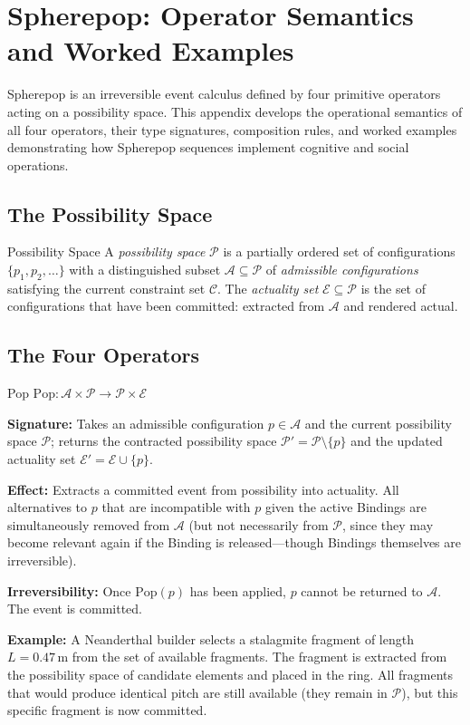 \chapter{Spherepop: Operator Semantics and Worked Examples}
\label{app:spherepop}

\noindent Spherepop is an irreversible event calculus defined by four primitive
operators acting on a possibility space. This appendix develops the operational
semantics of all four operators, their type signatures, composition rules, and
worked examples demonstrating how Spherepop sequences implement cognitive and
social operations.

\section{The Possibility Space}

\begin{definition}{Possibility Space}
A \emph{possibility space} $\mathcal{P}$ is a partially ordered set of
configurations $\{p_1, p_2, \ldots\}$ with a distinguished subset
$\mathcal{A} \subseteq \mathcal{P}$ of \emph{admissible configurations}
satisfying the current constraint set $\mathcal{C}$. The \emph{actuality set}
$\mathcal{E} \subseteq \mathcal{P}$ is the set of configurations that have
been committed: extracted from $\mathcal{A}$ and rendered actual.
\end{definition}

\section{The Four Operators}

\begin{definition}{Pop}
$\mathrm{Pop}: \mathcal{A} \times \mathcal{P} \to \mathcal{P} \times \mathcal{E}$

\textbf{Signature:} Takes an admissible configuration $p \in \mathcal{A}$ and
the current possibility space $\mathcal{P}$; returns the contracted possibility
space $\mathcal{P}' = \mathcal{P} \setminus \{p\}$ and the updated actuality set
$\mathcal{E}' = \mathcal{E} \cup \{p\}$.

\textbf{Effect:} Extracts a committed event from possibility into actuality. All
alternatives to $p$ that are incompatible with $p$ given the active Bindings are
simultaneously removed from $\mathcal{A}$ (but not necessarily from $\mathcal{P}$,
since they may become relevant again if the Binding is released---though Bindings
themselves are irreversible).

\textbf{Irreversibility:} Once $\mathrm{Pop}(p)$ has been applied, $p$ cannot
be returned to $\mathcal{A}$. The event is committed.

\textbf{Example:} A Neanderthal builder selects a stalagmite fragment of length
$L = 0.47\,\text{m}$ from the set of available fragments. The fragment is
extracted from the possibility space of candidate elements and placed in the ring.
All fragments that would produce identical pitch are still available (they remain
in $\mathcal{P}$), but this specific fragment is now committed.
\end{definition}

